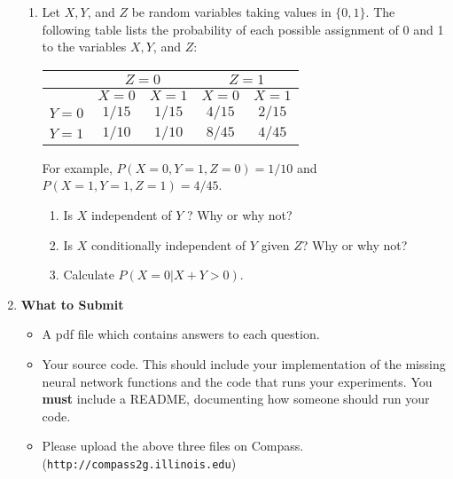 \begin{enumerate}
\begin{enumerate}
	\item  Let $X, Y$, and $Z$ be random variables taking values in $\{0, 1\}$. The following table lists the probability of each possible assignment of 0 and 1 to the variables $X, Y$, and $Z$:
	\begin{table}[H]
		\centering
		\begin{tabular}{|c|c|c|c|c|}
			\hline 
			& \multicolumn{2}{|c|}{$Z = 0$} & \multicolumn{2}{|c|}{ $Z = 1$}  \\ 
			\hline 
			& $X = 0$ & $X = 1$ & $X = 0$ & $X = 1$ \\ 
			\hline 
			$Y = 0$ & $1/15$ &   $1/15$ &  $4/15$ &  $2/15$  \\ 
			$Y = 1$ & $1/10$ &   $1/10$ &  $8/45$ &  $4/45$  \\ 
			\hline 
		\end{tabular}
	\end{table}
	For example, $P(X = 0, Y = 1, Z = 0) = 1/10$ and $P(X = 1, Y = 1, Z = 1) = 4/45$.
	\begin{enumerate}
		\item  Is $X$ independent of $Y$ ? Why or why not?
		\item  Is $X$ conditionally independent of $Y$ given $Z$? Why or why not?
		\item  Calculate $P(X = 0|X + Y > 0)$.
	\end{enumerate}

\end{enumerate}




	
	\item[] {\bf What to Submit}
  \begin{itemize}
    \item A pdf file which contains answers to each question.
        \item Your source code. This should include your implementation of the missing neural network functions and the code that runs your experiments. You {\bf must} include a README, documenting how someone should run your code.
       
    \item Please upload the above three files on Compass. (\texttt{http://compass2g.illinois.edu})
  \end{itemize}






\end{enumerate}





